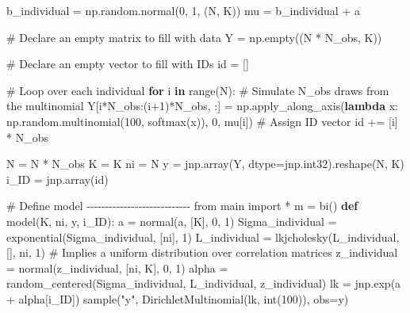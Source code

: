 \documentclass[
  letterpaper,
  DIV=11,
  numbers=noendperiod]{scrreprt}
\newenvironment{Shaded}{\begin{snugshade}}{\end{snugshade}}
\newcommand{\BuiltInTok}[1]{\textcolor[rgb]{0.00,0.23,0.31}{#1}}
\newcommand{\CommentTok}[1]{\textcolor[rgb]{0.37,0.37,0.37}{#1}}
\newcommand{\ControlFlowTok}[1]{\textcolor[rgb]{0.00,0.23,0.31}{\textbf{#1}}}
\newcommand{\DecValTok}[1]{\textcolor[rgb]{0.68,0.00,0.00}{#1}}
\newcommand{\ImportTok}[1]{\textcolor[rgb]{0.00,0.46,0.62}{#1}}
\newcommand{\KeywordTok}[1]{\textcolor[rgb]{0.00,0.23,0.31}{\textbf{#1}}}
\newcommand{\NormalTok}[1]{\textcolor[rgb]{0.00,0.23,0.31}{#1}}
\newcommand{\OperatorTok}[1]{\textcolor[rgb]{0.37,0.37,0.37}{#1}}
\newcommand{\StringTok}[1]{\textcolor[rgb]{0.13,0.47,0.30}{#1}}
\begin{document}
\begin{Shaded}
\begin{Highlighting}[]
\NormalTok{b\_individual }\OperatorTok{=}\NormalTok{ np.random.normal(}\DecValTok{0}\NormalTok{, }\DecValTok{1}\NormalTok{, (N, K))}
\NormalTok{mu }\OperatorTok{=}\NormalTok{ b\_individual }\OperatorTok{+}\NormalTok{ a}

\CommentTok{\# Declare an empty matrix to fill with data}
\NormalTok{Y }\OperatorTok{=}\NormalTok{ np.empty((N }\OperatorTok{*}\NormalTok{ N\_obs, K))}

\CommentTok{\# Declare an empty vector to fill with IDs}
\BuiltInTok{id} \OperatorTok{=}\NormalTok{ []}

\CommentTok{\# Loop over each individual}
\ControlFlowTok{for}\NormalTok{ i }\KeywordTok{in} \BuiltInTok{range}\NormalTok{(N):}
    \CommentTok{\# Simulate N\_obs draws from the multinomial}
\NormalTok{    Y[i}\OperatorTok{*}\NormalTok{N\_obs:(i}\OperatorTok{+}\DecValTok{1}\NormalTok{)}\OperatorTok{*}\NormalTok{N\_obs, :] }\OperatorTok{=}\NormalTok{ np.apply\_along\_axis(}\KeywordTok{lambda}\NormalTok{ x: np.random.multinomial(}\DecValTok{100}\NormalTok{, softmax(x)), }\DecValTok{0}\NormalTok{, mu[i])}
    \CommentTok{\# Assign ID vector}
    \BuiltInTok{id} \OperatorTok{+=}\NormalTok{ [i] }\OperatorTok{*}\NormalTok{ N\_obs}

\NormalTok{N }\OperatorTok{=}\NormalTok{ N }\OperatorTok{*}\NormalTok{ N\_obs}
\NormalTok{K }\OperatorTok{=}\NormalTok{ K}
\NormalTok{ni }\OperatorTok{=}\NormalTok{ N}
\NormalTok{y }\OperatorTok{=}\NormalTok{ jnp.array(Y, dtype}\OperatorTok{=}\NormalTok{jnp.int32).reshape(N, K)}
\NormalTok{i\_ID }\OperatorTok{=}\NormalTok{ jnp.array(}\BuiltInTok{id}\NormalTok{)}

\CommentTok{\# Define model {-}{-}{-}{-}{-}{-}{-}{-}{-}{-}{-}{-}{-}{-}{-}{-}{-}{-}{-}{-}{-}{-}{-}{-}{-}{-}{-}{-}}
\ImportTok{from}\NormalTok{ main }\ImportTok{import} \OperatorTok{*}
\NormalTok{m }\OperatorTok{=}\NormalTok{ bi()}
\KeywordTok{def}\NormalTok{ model(K, ni, y, i\_ID):}
\NormalTok{    a }\OperatorTok{=}\NormalTok{ normal(}\StringTok{\textquotesingle{}a\textquotesingle{}}\NormalTok{, [K], }\DecValTok{0}\NormalTok{, }\DecValTok{1}\NormalTok{)}
\NormalTok{    Sigma\_individual }\OperatorTok{=}\NormalTok{ exponential(}\StringTok{\textquotesingle{}Sigma\_individual\textquotesingle{}}\NormalTok{, [ni], }\DecValTok{1}\NormalTok{)}
\NormalTok{    L\_individual }\OperatorTok{=}\NormalTok{ lkjcholesky(}\StringTok{\textquotesingle{}L\_individual\textquotesingle{}}\NormalTok{, [], ni, }\DecValTok{1}\NormalTok{)  }\CommentTok{\# Implies a uniform distribution over correlation matrices}
\NormalTok{    z\_individual }\OperatorTok{=}\NormalTok{ normal(}\StringTok{\textquotesingle{}z\_individual\textquotesingle{}}\NormalTok{, [ni, K], }\DecValTok{0}\NormalTok{, }\DecValTok{1}\NormalTok{)}
\NormalTok{    alpha }\OperatorTok{=}\NormalTok{ random\_centered(Sigma\_individual, L\_individual, z\_individual)}
\NormalTok{    lk }\OperatorTok{=}\NormalTok{ jnp.exp(a }\OperatorTok{+}\NormalTok{ alpha[i\_ID])}
\NormalTok{    sample(}\StringTok{"y"}\NormalTok{, DirichletMultinomial(lk, }\BuiltInTok{int}\NormalTok{(}\DecValTok{100}\NormalTok{)), obs}\OperatorTok{=}\NormalTok{y)}


\end{Highlighting}
\end{Shaded}
\end{document}
